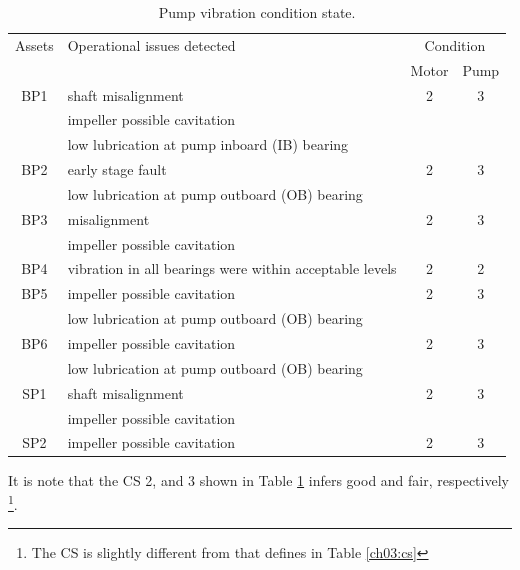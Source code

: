 \begin{table}[!h]
	\caption{Pump vibration condition state.}
	\label{ch05_tbl_vibration}
	{\footnotesize
\begin{tabular}{l|l|l|l}
	\hline
	\multicolumn{1}{c|}{Assets} & Operational issues detected & \multicolumn{2}{c}{Condition} \\ 
	\cline{3-4}
	\multicolumn{1}{c|}{} &  & \multicolumn{1}{c|}{Motor} & \multicolumn{1}{c}{Pump} \\ 
	\hline
	\multicolumn{1}{c|}{BP1} & shaft misalignment & \multicolumn{1}{c|}{2} & \multicolumn{1}{c}{3} \\ 
	\multicolumn{1}{c|}{} & impeller possible cavitation & \multicolumn{1}{c|}{} & \multicolumn{1}{c}{} \\ 
	\multicolumn{1}{c|}{} & low lubrication at pump inboard (IB) bearing & \multicolumn{1}{c|}{} & \multicolumn{1}{c}{} \\ 
	\hline
	\multicolumn{1}{c|}{BP2} & early stage fault  & \multicolumn{1}{c|}{2} & \multicolumn{1}{c}{3} \\ 
	\multicolumn{1}{c|}{} & low lubrication at pump outboard (OB) bearing & \multicolumn{1}{c|}{} & \multicolumn{1}{c}{} \\ 
	\hline
	\multicolumn{1}{c|}{BP3} & misalignment & \multicolumn{1}{c|}{2} & \multicolumn{1}{c}{3} \\ 
	\multicolumn{1}{c|}{} & impeller possible cavitation & \multicolumn{1}{c|}{} & \multicolumn{1}{c}{} \\ 
	\hline
	\multicolumn{1}{c|}{BP4} & vibration in all bearings were within acceptable levels & \multicolumn{1}{c|}{2} & \multicolumn{1}{c}{2} \\ 
	\hline
	\multicolumn{1}{c|}{BP5} & impeller possible cavitation & \multicolumn{1}{c|}{2} & \multicolumn{1}{c}{3} \\ 
	\multicolumn{1}{c|}{} & low lubrication at pump outboard (OB) bearing & \multicolumn{1}{c|}{} & \multicolumn{1}{c}{} \\ 
	\hline
	\multicolumn{1}{c|}{BP6} & impeller possible cavitation & \multicolumn{1}{c|}{2} & \multicolumn{1}{c}{3} \\ 
	\multicolumn{1}{c|}{} & low lubrication at pump outboard (OB) bearing & \multicolumn{1}{c|}{} & \multicolumn{1}{c}{} \\ 
	\hline
	\multicolumn{1}{c|}{SP1} & shaft misalignment & \multicolumn{1}{c|}{2} & \multicolumn{1}{c}{3} \\ 
	\multicolumn{1}{c|}{} & impeller possible cavitation & \multicolumn{1}{c|}{} & \multicolumn{1}{c}{} \\ 
	\hline
	\multicolumn{1}{c|}{SP2} & impeller possible cavitation & \multicolumn{1}{c|}{2} & \multicolumn{1}{c}{3} \\ 
	\hline
\end{tabular}
	}
\end{table}
It is note that the CS 2, and 3 shown in Table \ref{ch05_tbl_vibration} infers good and fair, respectively \footnote{The CS is slightly different from that defines in Table \ref{ch03:cs}}. 


